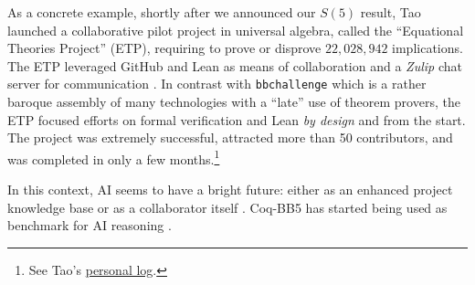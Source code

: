 \documentclass[a4paper,british]{article}
\theoremstyle{definition} %
\numberwithin{equation}{section}
\theoremstyle{definition} %
\newcommand{\CoqBB}{Coq-BB5\xspace}
\begin{document}
As a concrete example, shortly after we announced our $S(5)$ result, Tao launched a collaborative pilot project in universal algebra, called the ``Equational Theories Project'' (ETP), requiring to prove or disprove $22,028,942$ implications. The ETP leveraged GitHub and Lean as means of collaboration and a \textit{Zulip} chat server for communication \cite{TaoBlog, ETPGithub, ETPpaper}. In contrast with \texttt{bbchallenge} which is a rather baroque assembly of many technologies with a ``late'' use of theorem provers, the ETP focused efforts on formal verification and Lean \textit{by design} and from the start. The project was extremely successful, attracted more than 50 contributors, and was completed in only a few months.\footnote{See Tao's \href{https://github.com/teorth/equational_theories/wiki/Terence-Tao's-personal-log}{personal log}.}

In this context, AI seems to have a bright future: either as an enhanced project knowledge base or as a collaborator itself \cite{Trinh2024, wu2024internlm25stepproveradvancingautomatedtheorem}. \CoqBB has started being used as  benchmark for AI reasoning \cite{teodorescu2024nlir}.






\end{document}
